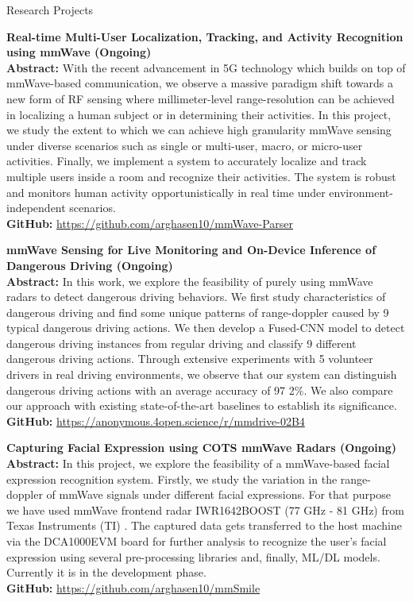 \documentclass{resume} %
\begin{document}
	\begin{rSection}{Research Projects}
		\begin{rSubsection}{}{}{}{}
			\item \textbf{Real-time Multi-User Localization, Tracking, and Activity Recognition using mmWave (Ongoing)}\\
			\textbf{Abstract:} With the recent advancement in 5G technology which builds on top of mmWave-based communication, we observe a massive paradigm shift towards a new form of RF sensing where millimeter-level range-resolution can be achieved in localizing a human subject or in determining their activities. In this project, we study the extent to which we can achieve high granularity mmWave sensing under diverse scenarios such as single or multi-user, macro, or micro-user activities. Finally, we implement a system to accurately localize and track multiple users inside a room and recognize their activities. The system is robust and monitors human activity opportunistically in real time under environment-independent scenarios. \\
			\textbf{GitHub:} \url{https://github.com/arghasen10/mmWave-Parser }
			
			\item \textbf{mmWave Sensing for Live Monitoring and On-Device Inference of Dangerous Driving (Ongoing)}\\
			\textbf{Abstract:} In this work, we explore the feasibility of purely using mmWave radars to detect dangerous driving behaviors. We first study characteristics of dangerous driving and find some unique patterns of range-doppler caused by 9 typical dangerous driving actions. We then develop a Fused-CNN model to detect dangerous driving instances from regular driving and classify 9 different dangerous driving actions. Through extensive experiments with 5 volunteer drivers in real driving environments, we observe that our system can distinguish dangerous driving actions with an average accuracy of 97
			2\%. We also compare our approach with existing state-of-the-art baselines to establish its significance. \\
			\textbf{GitHub:} \url{https://anonymous.4open.science/r/mmdrive-02B4}
			
			\item \textbf{Capturing Facial Expression using COTS mmWave Radars (Ongoing)}\\
			\textbf{Abstract:} In this project, we explore the feasibility of a mmWave-based facial expression recognition system. Firstly, we study the variation in the range-doppler of mmWave signals under different facial expressions. For that purpose we have used mmWave frontend radar IWR1642BOOST (77 GHz - 81 GHz) from Texas Instruments (TI) . The captured data gets transferred to the host machine via the DCA1000EVM board for further analysis to recognize the user's facial expression using several pre-processing libraries and, finally, ML/DL models. Currently it is in the development phase.\\
			\textbf{GitHub: }\url{https://github.com/arghasen10/mmSmile}
			
		\end{rSubsection}
	\end{rSection}
	
\end{document}
